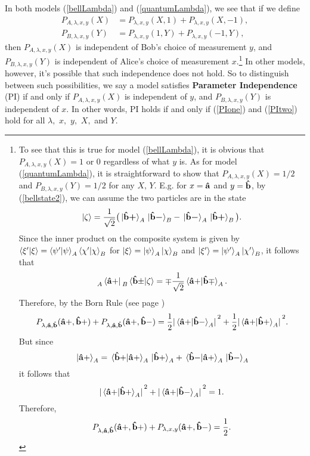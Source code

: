 In both models (\ref{bellLambda}) and (\ref{quantumLambda}), we see that if we define
\begin{align}
P_{A, \lambda,x,y}(X)&=P_{\lambda,x,y}(X, 1)+P_{\lambda,x,y}(X, -1),\label{PIone}\\
P_{B, \lambda,x,y}(Y)&=P_{\lambda,x,y}(1, Y)+P_{\lambda,x,y}(-1, Y),\label{PItwo}
\end{align}
then $P_{A,\lambda,x,y}(X)$ is independent of Bob's choice of measurement $y$, and $P_{B,\lambda,x,y}(Y)$ is independent of Alice's choice of measurement $x$.\footnote{To see that this is true for model (\ref{bellLambda}), it is obvious that $P_{A, \lambda,x,y}(X)=1$ or 0 regardless of what $y$ is. As for model (\ref{quantumLambda}), it is straightforward to show\label{onehalf} that $P_{A, \lambda,x,y}(X)=1/2$ and $P_{B,\lambda,x,y}(Y)=1/2$ for any $X,\, Y$. E.g. for $x=\vb{\hat{a}}$ and $y=\vb{\hat{b}}$, by (\ref{bellstate2}), we can assume the two particles are in the state 
$$\ket{\zeta}=\frac{1}{\sqrt{2}}\big(\ket*{\vb{\hat{{b}}}\bm{+}}_A\ket*{\vb{\hat{{b}}}\bm{-}}_B-\ket*{\vb{\hat{{b}}}\bm{-}}_A\ket*{\vb{\hat{{b}}}\bm{+}}_B\big).$$
Since the inner product on the composite system is given by  $\ip{\xi'}{\xi}=\ip{\psi'}{\psi}_A\ip{\chi'}{\chi}_B$ for $\ket{\xi}=\ket{\psi}_A\ket{\chi}_B$ and $\ket{\xi'}=\ket{\psi'}_A\ket{\chi'}_B$, it follows that 
$$\prescript{}{A}{ \bra*{\vb{\hat{a}+}}}\prescript{}{B}{\ip*{\vb{\hat{b}\pm}}{\zeta}}=\mp\frac{1}{\sqrt{2}}\ip*{\vb{\hat{a}+}}{\vb{\hat{b}\mp}}_A.$$ 
Therefore, by the Born Rule (see page \pageref{bornrule})
$$P_{\lambda,\vb{\hat{a}},\vb{\hat{b}}}(\vb{\hat{a}+}, \vb{\hat{b}+})+P_{\lambda,\vb{\hat{a}},\vb{\hat{b}}}(\vb{\hat{a}+}, \vb{\hat{b}-})=\frac{1}{2}\abs*{\ip*{\vb{\hat{a}+}}{\vb{\hat{b}-}}_A}^2+\frac{1}{2}\abs*{\ip*{\vb{\hat{a}+}}{\vb{\hat{b}+}}_A}^2.$$
But since
$$\ket*{\vb{\hat{a}+}}_A=\ip*{\vb{\hat{b}+}}{\vb{\hat{a}+}}_A\ket*{\vb{\hat{b}+}}_A+\ip*{\vb{\hat{b}-}}{\vb{\hat{a}+}}_A\ket*{\vb{\hat{b}-}}_A$$
it follows that 
$$\abs*{\ip*{\vb{\hat{a}+}}{\vb{\hat{b}+}}_A}^2+\abs*{\ip*{\vb{\hat{a}+}}{\vb{\hat{b}-}}_A}^2 =1. $$
Therefore, 
$$P_{\lambda,\vb{\hat{a}},\vb{\hat{b}}}(\vb{\hat{a}+}, \vb{\hat{b}+})+P_{\lambda,x,y}(\vb{\hat{a}+}, \vb{\hat{b}-})=\frac{1}{2}.$$
 } In other models, however, it's possible that such independence does not hold. So to distinguish between such possibilities, we say a model satisfies \textbf{Parameter Independence} (PI) \label{PIdef} if and only if $P_{A,\lambda,x,y}(X)$ is independent of $y$, and $P_{B,\lambda,x,y}(Y)$ is independent of $x$. In other words, PI holds if and only if (\ref{PIone}) and (\ref{PItwo}) hold for all $\lambda,$ $x,$ $y,$ $X,$ and $Y$.

